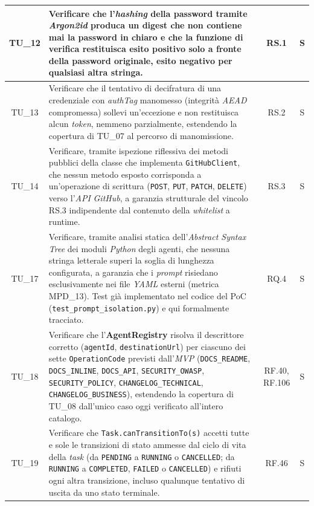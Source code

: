 \documentclass[12pt, a4paper]{article}
\newlength{\LargColVal} %
\begin{document}
\begin{xltabular}{\textwidth}{|c|X|C{\LargColVal}|C{\LargColVal}|}
    TU\_12 & Verificare che l'\textit{hashing} della password tramite \textit{Argon2id} produca un digest che non contiene mai la password in chiaro e che la funzione di verifica restituisca esito positivo solo a fronte della password originale, esito negativo per qualsiasi altra stringa. & RS.1 & S \\ \hline

    TU\_13 & Verificare che il tentativo di decifratura di una credenziale con \textit{authTag} manomesso (integrità \textit{AEAD} compromessa) sollevi un'eccezione e non restituisca alcun \textit{token}, nemmeno parzialmente, estendendo la copertura di TU\_07 al percorso di manomissione. & RS.2 & S \\ \hline

    TU\_14 & Verificare, tramite ispezione riflessiva dei metodi pubblici della classe che implementa \texttt{GitHubClient}, che nessun metodo esposto corrisponda a un'operazione di scrittura (\texttt{POST}, \texttt{PUT}, \texttt{PATCH}, \texttt{DELETE}) verso l'\textit{API} \textit{GitHub}, a garanzia strutturale del vincolo RS.3 indipendente dal contenuto della \textit{whitelist} a runtime. & RS.3 & S \\ \hline



    TU\_17 & Verificare, tramite analisi statica dell'\textit{Abstract Syntax Tree} dei moduli \textit{Python} degli agenti, che nessuna stringa letterale superi la soglia di lunghezza configurata, a garanzia che i \textit{prompt} risiedano esclusivamente nei file \textit{YAML} esterni (metrica MPD\_13). Test già implementato nel codice del PoC (\texttt{test\_prompt\_isolation.py}) e qui formalmente tracciato. & RQ.4 & S \\ \hline

    TU\_18 & Verificare che l'\textbf{AgentRegistry} risolva il descrittore corretto (\texttt{agentId}, \texttt{destinationUrl}) per ciascuno dei sette \texttt{OperationCode} previsti dall'\textit{MVP} (\texttt{DOCS\_README}, \texttt{DOCS\_INLINE}, \texttt{DOCS\_API}, \texttt{SECURITY\_OWASP}, \texttt{SECURITY\_POLICY}, \texttt{CHANGELOG\_TECHNICAL}, \texttt{CHANGELOG\_BUSINESS}), estendendo la copertura di TU\_08 dall'unico caso oggi verificato all'intero catalogo. & RF.40, RF.106 & S \\ \hline

    TU\_19 & Verificare che \texttt{Task.canTransitionTo(s)} accetti tutte e sole le transizioni di stato ammesse dal ciclo di vita della \textit{task} (da \texttt{PENDING} a \texttt{RUNNING} o \texttt{CANCELLED}; da \texttt{RUNNING} a \texttt{COMPLETED}, \texttt{FAILED} o \texttt{CANCELLED}) e rifiuti ogni altra transizione, incluso qualunque tentativo di uscita da uno stato terminale. & RF.46 & S \\ \hline


\end{xltabular}
\end{document}
